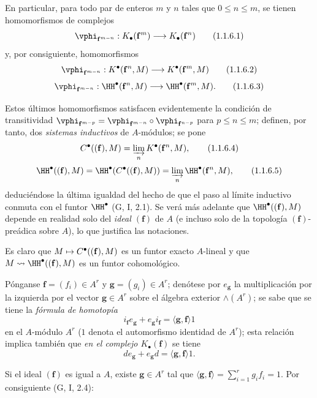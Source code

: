 \documentclass[oneside]{amsart}
\makeatletter
\renewcommand{\leq}{\leqslant}
\newcommand{\ega@arrow}[2]{\mathchoice{#1}{#2}{#2}{#2}}
\let\ega@shortmapsto\mapsto
\renewcommand{\to}{\ega@arrow{\longrightarrow}{\rightarrow}}
\renewcommand{\mapsto}{\ega@arrow{\longmapsto}{\ega@shortmapsto}}
\newcommand{\oldpage}[2][]{{\marginnote{\normalfont\textbf{#1}~|~#2}}\ignorespaces}
\let\EGAOriginalLabel\label
\renewcommand{\label}[1]{\phantomsection\EGAOriginalLabel{#1}}
\makeatother
\begin{document}
\begin{env}[1.1.6]
\label{III.1.1.6}
En particular, para todo par de enteros $m$ y $n$ tales que $0\leq n\leq m$, se tienen homomorfismos de complejos
\[
  \vphi_{\mathbf{f}^{m-n}}:K_\bullet(\mathbf{f}^m)\to K_\bullet(\mathbf{f}^n)
  \tag{1.1.6.1}
\]
y, por consiguiente, homomorfismos
\[
  \vphi_{\mathbf{f}^{m-n}}:K^\bullet(\mathbf{f}^n,M)\to K^\bullet(\mathbf{f}^m,M)
  \tag{1.1.6.2}
\]
\[
  \vphi_{\mathbf{f}^{m-n}}:\HH^\bullet(\mathbf{f}^n,M)\to\HH^\bullet(\mathbf{f}^m,M).
  \tag{1.1.6.3}
\]

\oldpage[III]{85}
Estos últimos homomorfismos satisfacen evidentemente la condición de transitividad $\vphi_{\mathbf{f}^{m-p}}=\vphi_{\mathbf{f}^{m-n}}\circ\vphi_{\mathbf{f}^{n-p}}$ para $p\leq n\leq m$; definen, por tanto, dos \emph{sistemas inductivos} de $A$-módulos; se pone
\[
  C^\bullet((\mathbf{f}),M)=\varinjlim_n K^\bullet(\mathbf{f}^n,M),
  \tag{1.1.6.4}
\]
\[
  \HH^\bullet((\mathbf{f}),M)=\HH^\bullet(C^\bullet((\mathbf{f}),M))=\varinjlim_n\HH^\bullet(\mathbf{f}^n,M),
  \tag{1.1.6.5}
\]
deduciéndose la última igualdad del hecho de que el paso al límite inductivo conmuta con el funtor $\HH^\bullet$ (G, I, 2.1).
Se verá más adelante  que $\HH^\bullet((\mathbf{f}),M)$ depende en realidad solo del \emph{ideal $(\mathbf{f})$} de $A$ (e incluso solo de la topología $(\mathbf{f})$-preádica sobre $A$), lo que justifica las notaciones.

Es claro que $M\mapsto C^\bullet((\mathbf{f}),M)$ es un funtor exacto $A$-lineal y que $M\leadsto\HH^\bullet((\mathbf{f}),M)$ es un funtor cohomológico.
\end{env}

\begin{env}[1.1.7]
\label{III.1.1.7}
Pónganse $\mathbf{f}=(f_i)\in A^r$ y $\mathbf{g}=(g_i)\in A^r$; denótese por $e_\mathbf{g}$ la multiplicación por la izquierda por el vector $\mathbf{g}\in A^r$ sobre el álgebra exterior $\wedge(A^r)$; se sabe que se tiene la \emph{fórmula de homotopía}
\[
  i_\mathbf{f}e_\mathbf{g}+e_\mathbf{g}i_\mathbf{f}=\langle\mathbf{g},\mathbf{f}\rangle 1
  \tag{1.1.7.1}
\]
en el $A$-módulo $A^r$ ($1$ denota el automorfismo identidad de $A^r$); esta relación implica también que \emph{en el complejo $K_\bullet(\mathbf{f})$} se tiene
\[
  de_\mathbf{g}+e_\mathbf{g}d=\langle\mathbf{g},\mathbf{f}\rangle 1.
  \tag{1.1.7.2}
\]

Si el ideal $(\mathbf{f})$ es igual a $A$, existe $\mathbf{g}\in A^r$ tal que $\langle\mathbf{g},\mathbf{f}\rangle=\sum_{i=1}^r g_i f_i=1$.
Por consiguiente (G, I, 2.4):
\end{env}
\end{document}
